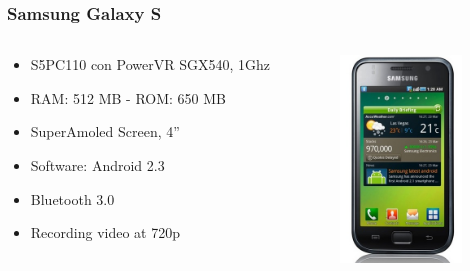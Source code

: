 \documentclass{beamer}
\begin{document}
\begin{frame}
\frametitle{Samsung Galaxy S}

\begin{columns}
\begin{column}{0.5\textwidth}

\begin{itemize}

\item S5PC110 con PowerVR SGX540, 1Ghz
\item RAM: 512 MB - ROM: 650 MB
\item SuperAmoled Screen, 4''
\item Software: Android 2.3
\item Bluetooth 3.0
\item Recording video at 720p
\end{itemize}
\end{column}

\begin{column}{0.5\textwidth}
\begin{center}
  \includegraphics[height=5.5cm]{figs/samsung-galaxy-s}
\end{center}
\end{column}
\end{columns}
\end{frame}
\end{document}
